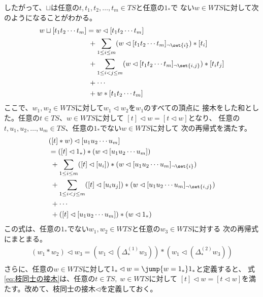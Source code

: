 	したがって、$\sqcup$は任意の$t,t_1,t_2,\dots,t_m\in TS$と任意の$1_*$で
	ない$w\in WTS$に対して次のようになることがわかる。
	\begin{equation}\label{eq:接木による積}\begin{split} %
		w\sqcup[t_1t_2\cdots t_m]
		&= w\lhd[t_1t_2\cdots t_m] \\
		&\;+ \sum_{1\le i\le m}(w\lhd[t_1t_2\cdots t_m]_{\neg\set{i}})*[t_i] \\
		&\;+ \sum_{1\le i<j\le m}(w\lhd[t_1t_2\cdots t_m]_{\neg\set{i,j}})*[t_it_j] \\
		&\;+ \cdots \\
		&\;+ w*[t_1t_2\cdots t_m] \\
	\end{split}\end{equation} %
	ここで、$w_1,w_2\in WTS$に対して$w_1\lhd w_2$を$w_1$のすべての頂点に
	接木をした和とした。任意の$t\in TS$、$w\in WTS$に対して
	$[t]\lhd w=[t\lhd w]$となり、
	任意の$t,u_1,u_2,\dots,u_m\in TS$、任意の$1_*$でない$w\in WTS$に対して
	次の再帰式を満たす。
	\begin{equation*}\begin{split} %
		&([t]*w)\lhd [u_1u_2\cdots u_m] \\
		&= ([t]\lhd 1_*)*(w\lhd [u_1u_2\cdots u_m]) \\
		&\;+ \sum_{1\le i\le m}([t]\lhd[u_i])*(w\lhd [u_1u_2\cdots u_m]_{\neg\set{i}}) \\
		&\; + \sum_{1\le i<j\le m}([t]\lhd[u_iu_j])*(w\lhd [u_1u_2\cdots u_m]_{\neg\set{i,j}}) \\
		&\; + \cdots \\
		&\; + ([t]\lhd [u_1u_2\cdots u_m])*(w\lhd 1_*) \\
	\end{split}\end{equation*} %
	この式は、任意の$1_*$でない$w_1,w_2\in WTS$と任意の$w_3\in WTS$に対する
	次の再帰式にまとまる。
	\begin{equation}\label{eq:枝同士の接木}\begin{split} %
		(w_1*w_2)\lhd w_3 = \left(w_1\lhd (\Delta_*^{(1)}w_3)\right)*\left(w_1\lhd (\Delta_*^{(2)}w_3)\right) \\
	\end{split}\end{equation} %
	さらに、任意の$w\in WTS$に対して$1_*\lhd w=\jump{w=1_*}1_*$と定義すると、
	式\eqref{eq:枝同士の接木}は、任意の$t\in TS,\;w\in WTS$に対して
	$[t]\lhd w=[t\lhd w]$を満たす。改めて、枝同士の接木$\lhd$を定義しておく。

